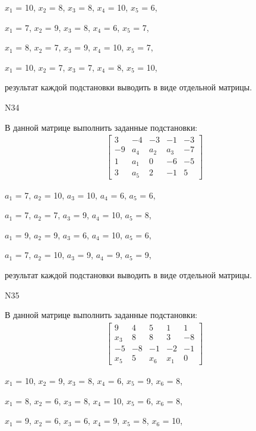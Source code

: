 \documentclass[11pt]{report}
\begin{document}
$x_{1}$ = 10, $x_{2}$ = 8, $x_{3}$ = 8, $x_{4}$ = 10, $x_{5}$ = 6, 

$x_{1}$ = 7, $x_{2}$ = 9, $x_{3}$ = 8, $x_{4}$ = 6, $x_{5}$ = 7, 

$x_{1}$ = 8, $x_{2}$ = 7, $x_{3}$ = 9, $x_{4}$ = 10, $x_{5}$ = 7, 

$x_{1}$ = 10, $x_{2}$ = 7, $x_{3}$ = 7, $x_{4}$ = 8, $x_{5}$ = 10, 

результат каждой подстановки выводить в виде отдельной матрицы.

N34

В данной матрице выполнить заданные подстановки:
\begin{align*}
\left[\begin{matrix}3 & -4 & -3 & -1 & -3\\-9 & a_{4} & a_{2} & a_{3} & -7\\1 & a_{1} & 0 & -6 & -5\\3 & a_{5} & 2 & -1 & 5\end{matrix}\right]
\end{align*}


$a_{1}$ = 7, $a_{2}$ = 10, $a_{3}$ = 10, $a_{4}$ = 6, $a_{5}$ = 6, 

$a_{1}$ = 7, $a_{2}$ = 7, $a_{3}$ = 9, $a_{4}$ = 10, $a_{5}$ = 8, 

$a_{1}$ = 9, $a_{2}$ = 9, $a_{3}$ = 6, $a_{4}$ = 10, $a_{5}$ = 6, 

$a_{1}$ = 7, $a_{2}$ = 10, $a_{3}$ = 9, $a_{4}$ = 9, $a_{5}$ = 9, 

результат каждой подстановки выводить в виде отдельной матрицы.

N35

В данной матрице выполнить заданные подстановки:
\begin{align*}
\left[\begin{matrix}9 & 4 & 5 & 1 & 1\\x_{3} & 8 & 8 & 3 & -8\\-5 & -8 & -1 & -2 & -1\\x_{5} & 5 & x_{6} & x_{1} & 0\end{matrix}\right]
\end{align*}


$x_{1}$ = 10, $x_{2}$ = 9, $x_{3}$ = 8, $x_{4}$ = 6, $x_{5}$ = 9, $x_{6}$ = 8, 

$x_{1}$ = 8, $x_{2}$ = 6, $x_{3}$ = 8, $x_{4}$ = 10, $x_{5}$ = 6, $x_{6}$ = 8, 

$x_{1}$ = 9, $x_{2}$ = 6, $x_{3}$ = 6, $x_{4}$ = 9, $x_{5}$ = 8, $x_{6}$ = 10, 
\end{document}
